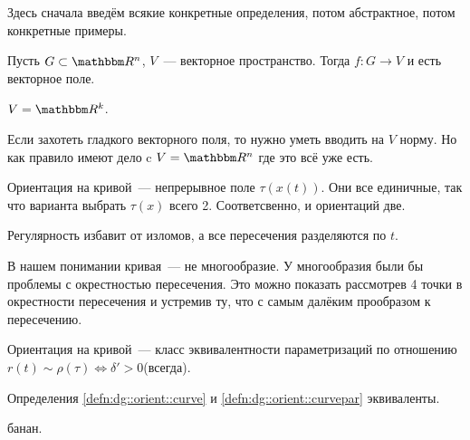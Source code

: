 \documentclass[draft,timbord]{longnotes}
\begin{document}
Здесь сначала введём всякие конкретные определения, потом абстрактное, потом конкретные примеры.

\begin{defn}\label{defn:dg::orient::vecf}
  Пусть $G \subset \R^n$, $V$~--- векторное пространство. Тогда $f \colon G \to V$ и есть векторное 
  поле.
\end{defn}
\begin{exmp}\label{exmp:dg::orient::vecf}
  $V = \R^k$.
\end{exmp}

\begin{rem}\label{rem:dg::orient::vecf} 
  Если захотеть гладкого векторного поля,
  то нужно уметь вводить на $V$ норму.  Но как правило имеют
  дело c $V = \R^n$ где это всё уже есть.
\end{rem}

\begin{defn}\label{defn:dg::orient::curve}
  Ориентация на кривой~--- непрерывное поле $\tau(x(t))$. Они все единичные, так что варианта
  выбрать $\tau(x)$ всего 2. Соответсвенно, и ориентаций две.
\end{defn}
\begin{rem}\label{rem:dg::orient::curvecor}
  Регулярность избавит от изломов, а все пересечения разделяются по $t$.
\end{rem}

\begin{rem}[\flame]\label{rem:dg::orient::curverman}
  В нашем понимании кривая~--- не многообразие. У многообразия были бы проблемы с окрестностью
  пересечения. Это можно показать рассмотрев 4 точки в окрестности пересечения и устремив ту, что
  с самым далёким прообразом к пересечению.
\end{rem}

\begin{defn}\label{defn:dg::orient::curvepar}
  Ориентация на кривой~--- класс эквивалентности параметризаций по отношению
  $r(t) \sim \rho(\tau )  \Leftrightarrow  \delta' > 0$(всегда). 
\end{defn}

\begin{prop}\label{prop:dg::orient::eqcurve}
  Определения \ref{defn:dg::orient::curve} и \ref{defn:dg::orient::curvepar} эквиваленты.
\end{prop}
\begin{lproof}
  банан.
\end{lproof}
\end{document}
